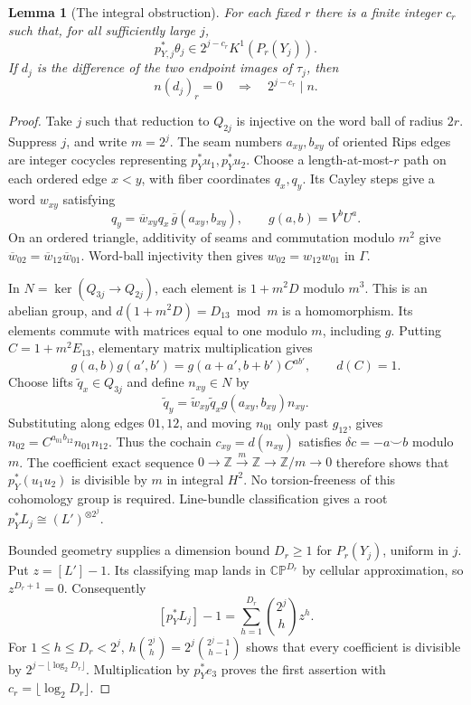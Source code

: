 \documentclass[11pt]{article}
\newtheorem{lemma}[theorem]{Lemma}
\theoremstyle{remark}\newtheorem{remark}[theorem]{Remark}
\newcommand{\Z}{\mathbb Z}\newcommand{\Q}{\mathbb Q}\newcommand{\R}{\mathbb R}
\begin{document}
\begin{lemma}[The integral obstruction]\label{lem:div}
For each fixed $r$ there is a finite integer $c_r$ such that, for all
sufficiently large $j$,
\[
 p_{Y,j}^*\theta_j\in2^{j-c_r}K^1(P_r(Y_j)).
\]
If $d_j$ is the difference of the two endpoint images of $\tau_j$, then
\[
 n(d_j)_r=0\quad\Longrightarrow\quad 2^{j-c_r}\mid n.
\]
\end{lemma}
\begin{proof}
Take $j$ such that reduction to $Q_{2j}$ is injective on the word ball
of radius $2r$. Suppress $j$, and write $m=2^j$.
The seam numbers $a_{xy},b_{xy}$ of oriented Rips edges are integer
cocycles representing $p_Y^*u_1,p_Y^*u_2$. Choose a length-at-most-$r$ path
on each ordered edge $x<y$, with fiber coordinates $q_x,q_y$.
Its Cayley steps give a word $w_{xy}$ satisfying
\[
 q_y=\overline w_{xy}q_x\,\overline g(a_{xy},b_{xy}),\qquad
 g(a,b)=V^bU^a.
\]
On an ordered triangle, additivity of seams and commutation modulo $m^2$
give $\overline w_{02}=\overline w_{12}\overline w_{01}$. Word-ball
injectivity then gives $w_{02}=w_{12}w_{01}$ in $\Gamma$.

In $N=\ker(Q_{3j}\to Q_{2j})$, each element is $1+m^2D$ modulo $m^3$.
This is an abelian group, and $d(1+m^2D)=D_{13}\bmod m$ is a homomorphism.
Its elements commute with matrices equal to one modulo $m$, including $g$.
Putting $C=1+m^2E_{13}$, elementary matrix multiplication gives
\[
 g(a,b)g(a',b')=g(a+a',b+b')C^{ab'},\qquad d(C)=1.
\]
Choose lifts $\widetilde q_x\in Q_{3j}$ and define $n_{xy}\in N$ by
\[
 \widetilde q_y=\widetilde w_{xy}\widetilde q_x
                 g(a_{xy},b_{xy})n_{xy}.
\]
Substituting along edges $01,12$, and moving $n_{01}$ only past $g_{12}$,
gives $n_{02}=C^{a_{01}b_{12}}n_{01}n_{12}$. Thus the cochain
$c_{xy}=d(n_{xy})$ satisfies $\delta c=-a\smile b$ modulo $m$.
The coefficient exact sequence $0\to\Z\xrightarrow{m}\Z\to\Z/m\to0$
therefore shows that $p_Y^*(u_1u_2)$ is divisible by $m$ in integral
$H^2$. No torsion-freeness of this cohomology group is required.
Line-bundle classification gives a root $p_Y^*L_j\cong(L')^{\otimes2^j}$.

Bounded geometry supplies a dimension bound $D_r\geq1$ for $P_r(Y_j)$,
uniform in $j$. Put $z=[L']-1$. Its classifying map lands in
$\mathbb{CP}^{D_r}$ by cellular approximation, so $z^{D_r+1}=0$.
Consequently
\[
 [p_Y^*L_j]-1=\sum_{h=1}^{D_r}\binom{2^j}{h}z^h.
\]
For $1\leq h\leq D_r<2^j$,
$h\binom{2^j}{h}=2^j\binom{2^j-1}{h-1}$ shows that every coefficient is
divisible by $2^{j-\lfloor\log_2D_r\rfloor}$.
Multiplication by $p_Y^*e_3$ proves the first assertion with
$c_r=\lfloor\log_2D_r\rfloor$.


\end{proof}
\end{document}
